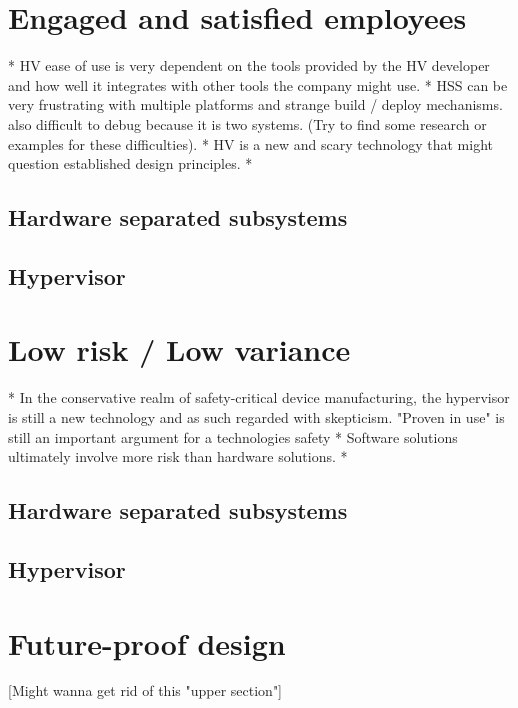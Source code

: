 
\section{Engaged and satisfied employees}

* HV ease of use is very dependent on the tools provided by the HV developer and how well it integrates with other tools the company might use.
* HSS can be very frustrating with multiple platforms and strange build / deploy mechanisms. also difficult to debug because it is two systems. (Try to find some research or examples for these difficulties).
* HV is a new and scary technology that might question established design principles.
* 
\subsection{Hardware separated subsystems}
\subsection{Hypervisor}


\section{Low risk / Low variance}
* In the conservative realm of safety-critical device manufacturing, the hypervisor is still a new technology and as such regarded with skepticism. "Proven in use" is still an important argument for a technologies safety
* Software solutions ultimately involve more risk than hardware solutions.
* 
\subsection{Hardware separated subsystems}
\subsection{Hypervisor}


\section{Future-proof design}
[Might wanna get rid of this "upper section"]
